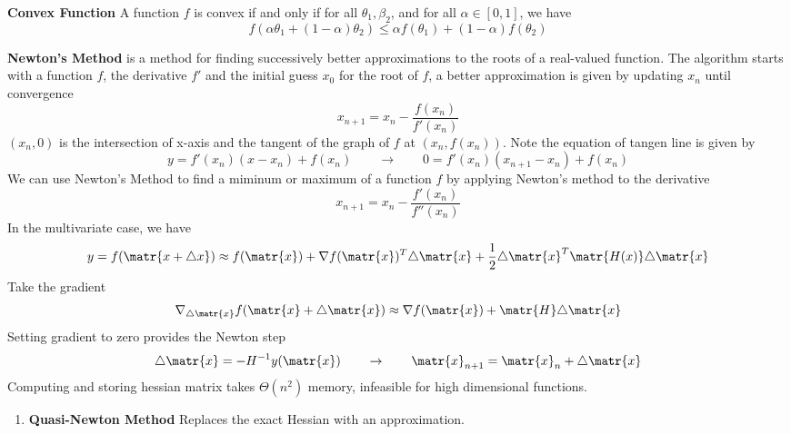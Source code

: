 \documentclass[11pt]{article}
\begin{document}
\begin{defn*}
    \textbf{Convex Function} A function $f$ is convex if and only if for all $\theta_1,\beta_2$, and for all $\alpha \in [0,1]$, we have 
    \[
        f(\alpha\theta_1 + (1-\alpha)\theta_2) \leq \alpha f(\theta_1) + (1-\alpha)f(\theta_2)    
    \]
\end{defn*}


\begin{defn*}
    \textbf{Newton's Method} is a method for finding successively better approximations to the roots of a real-valued function. The algorithm starts with a function $f$, the derivative $f'$ and the initial guess $x_0$ for the root of $f$, a better approximation is given by updating $x_n$ until convergence
    \[
        x_{n+1} = x_n - \frac{f(x_n)}{f'(x_n)}    
    \]
    $(x_n,0)$ is the intersection of x-axis and the tangent of the graph of $f$ at $(x_n,f(x_n))$. Note the equation of tangen line is given by 
    \[
        y = f'(x_n)(x-x_n) + f(x_n)    
        \quad \quad \rightarrow \quad \quad 
        0 = f'(x_n)(x_{n+1}-x_n) + f(x_n)
    \]
    We can use Newton's Method to find a miminum or maximum of a function $f$ by applying Newton's method to the derivative 
    \[
        x_{n+1} = x_n - \frac{f'(x_n)}{f''(x_n)}
    \]
    In the multivariate case, we have 
    \[
        y = f(\matr{x + \triangle x}) \approx 
        f(\matr{x}) + \nabla f(\matr{x})^T \triangle \matr{x}
        + \frac{1}{2} \triangle \matr{x}^T \matr{H(x)} \triangle \matr{x}
    \]
    Take the gradient
    \[
        \nabla_{\triangle \matr{x}} f(\matr{x} + \triangle \matr{x}) \approx \nabla f(\matr{x}) + \matr{H}\triangle \matr{x}    
    \]
    Setting gradient to zero provides the Newton step 
    \[
        \triangle \matr{x} = -H^{-1} y(\matr{x})
        \quad \quad \rightarrow \quad \quad 
        \matr{x}_{n+1} = \matr{x}_n + \triangle \matr{x}
    \]
    Computing and storing hessian matrix takes $\Theta(n^2)$ memory, infeasible for high dimensional functions. 
    \begin{enumerate}
        \item \textbf{Quasi-Newton Method} Replaces the exact Hessian with an approximation. 
    \end{enumerate}
\end{defn*}
\end{document}
